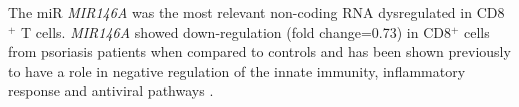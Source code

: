 The miR \textit{MIR146A} was the most relevant non-coding RNA dysregulated in CD8$^+$ T cells. \textit{MIR146A} showed down-regulation (fold change=0.73) in CD8$^+$ cells from psoriasis patients when compared to controls and has been shown previously to have a role in negative regulation of the innate immunity, inflammatory response and antiviral pathways \parencite{Taganov2006}.






